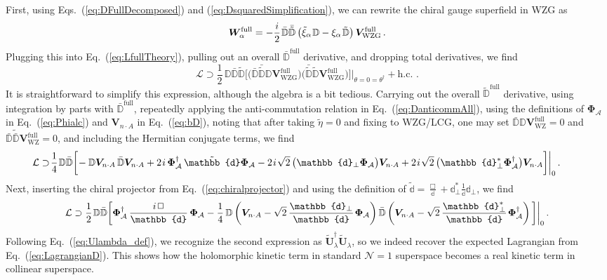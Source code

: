 \documentclass[12pt,document,nofootinbib,superscriptaddress,onecolumn,preprintnumbers,balancelastpage]{article}
\newcommand{\full}{\text{full}}
\newcommand{\s}{\hspace{0.8pt}}
\newcommand{\PP}{\mathbb{d}}
\DeclareRobustCommand{\Eq}[1]{Eq.~(\ref{#1})}
\DeclareRobustCommand{\Eqs}[2]{Eqs.~(\ref{#1}) and (\ref{#2})}
\newcommand{\bV}{ \boldsymbol V}
\newcommand{\bW}{ \boldsymbol W}
\newcommand{\bD}{ \boldsymbol{V}_{n \cdot A}}
\newcommand{\bPhialc}{ \boldsymbol{\Phi}_\alc}
\newcommand{\bU}{ \tilde{\boldsymbol U}}
\newcommand{\D}{\mathbb{D}}
\newcommand{\bea}{\begin{eqnarray}}
\newcommand{\eea}{\end{eqnarray}}
\newcommand{\alc}{\mathcal{A}}
\begin{document}
\begin{spacing}{1.2}
First, using \Eqs{eq:DFullDecomposed}{eq:DsquaredSimplification}, we can rewrite the chiral gauge superfield in WZG as
%
\begin{align}
\label{eq:Wdecom}
\bW^\text{full}_\alpha =- \frac{i}{2}\s  \bar{\D} \bar{\tilde{\D}}   \left(  \tilde{\xi}_\alpha\s \D- \xi_\alpha\s \tilde{\D} \right) \bV_{\text{WZG}}^{\full} \,.
\end{align}
%
Plugging this into \Eq{eq:LfullTheory}, pulling out an overall $\bar{\D}^\text{full}$ derivative, and dropping total derivatives, we find 
%
\begin{equation}
\mathcal{L}  \supset   \frac{1}{2}\, \D \bar{\D} \tilde{\D}  \bigg[ \Big(\bar{\D} \bar{\tilde{\D}} \D \bV_{\text{WZG}}^{\full}\Big) \Big(  \bar{\tilde{\D}} \tilde{\D}\bV_{\text{WZG}}^{\full}  \Big)  \bigg] \bigg|_{\theta = 0 = \theta^\dagger} + \text{h.c.}\,\,.
\end{equation}
%
It is straightforward to simplify this expression, although the algebra is a bit tedious.
%
Carrying out the overall $\tilde{\D}^\text{full}$ derivative, using integration by parts with $\bar{\D}^\text{full}$, repeatedly applying the anti-commutation relation  in \Eq{eq:DanticommAll}, using the definitions of $\bPhialc$ in \Eq{eq:Phialc} and $\bD$ in \Eq{eq:bD}, noting that after taking $\tilde{\eta} = 0$ and fixing to WZG/LCG, one may set  $\bar{\D} \D \bV_{\text{WZ}}^{\full} = 0$ and $\bar{\D} \tilde{\bar{\D}} \bV_{\text{WZ}}^{\full} = 0$, and including the Hermitian conjugate terms, we find
\bea
\hspace{-22pt}\mathcal{L}  \supset\!\frac{1}{4} \s\D \bar{\D} \bigg[\! - \D \bD\, \bar{\D} \bD +    2\s i \, \bPhialc^\dagger\, \tilde{\PP}  \bPhialc  - 2\s i\s \sqrt{2}\, \big( \PP_\perp  \bPhialc \big) \bD + 2\s i\s\sqrt{2}  \,\big( \PP_\perp^*  \bPhialc^\dagger \big) \bD \bigg] \bigg|_{0}\,.
\eea
Next, inserting the chiral projector from \Eq{eq:chiralprojector} and using the definition of $\tilde{\PP} = \frac{\Box}{\PP} + \PP_\perp^* \frac{1}{\PP} \PP_\perp$, we find
%
\begin{equation}
\label{eq:topdownabelianL}
\mathcal{L}  \supset   \frac{1}{2} \s\D \bar{\D}  \bigg[ \bPhialc^\dagger \,\frac{i\s \Box}{\PP}\, \bPhialc  -\frac{1}{4}\, \D \left(\bD - \sqrt{2} \, \frac{\PP_\perp}{\PP} \s\bPhialc \right) \bar{\D} \left(\bD - \sqrt{2} \, \frac{\PP_\perp^*}{\PP} \s\bPhialc^\dagger  \right)  \bigg] \bigg|_{0}\,.
\end{equation}
%
Following \Eq{eq:Ulambda_def}, we recognize the second expression as $\bU_\lambda^\dagger \bU_\lambda$, so we indeed recover the expected Lagrangian from \Eq{eq:LagrangianD}.
%
This shows how the holomorphic kinetic term in standard $\mathcal{N} = 1$ superspace becomes a real kinetic term in collinear superspace. 



\end{spacing}
\end{document}
